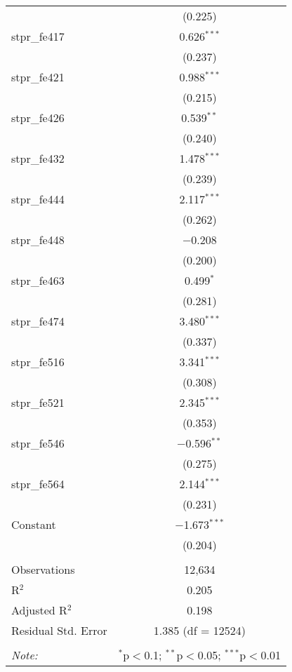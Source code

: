 \begin{table}[!htbp]
\begin{tabular}{@{\extracolsep{5pt}}lc}
  & (0.225) \\ 
  stpr\_fe417 & 0.626$^{***}$ \\ 
  & (0.237) \\ 
  stpr\_fe421 & 0.988$^{***}$ \\ 
  & (0.215) \\ 
  stpr\_fe426 & 0.539$^{**}$ \\ 
  & (0.240) \\ 
  stpr\_fe432 & 1.478$^{***}$ \\ 
  & (0.239) \\ 
  stpr\_fe444 & 2.117$^{***}$ \\ 
  & (0.262) \\ 
  stpr\_fe448 & $-$0.208 \\ 
  & (0.200) \\ 
  stpr\_fe463 & 0.499$^{*}$ \\ 
  & (0.281) \\ 
  stpr\_fe474 & 3.480$^{***}$ \\ 
  & (0.337) \\ 
  stpr\_fe516 & 3.341$^{***}$ \\ 
  & (0.308) \\ 
  stpr\_fe521 & 2.345$^{***}$ \\ 
  & (0.353) \\ 
  stpr\_fe546 & $-$0.596$^{**}$ \\ 
  & (0.275) \\ 
  stpr\_fe564 & 2.144$^{***}$ \\ 
  & (0.231) \\ 
  Constant & $-$1.673$^{***}$ \\ 
  & (0.204) \\ 
 \hline \\[-1.8ex] 
Observations & 12,634 \\ 
R$^{2}$ & 0.205 \\ 
Adjusted R$^{2}$ & 0.198 \\ 
Residual Std. Error & 1.385 (df = 12524) \\ 
\hline 
\hline \\[-1.8ex] 
\textit{Note:}  & \multicolumn{1}{r}{$^{*}$p$<$0.1; $^{**}$p$<$0.05; $^{***}$p$<$0.01} \\ 
\end{tabular} 
\end{table} 
